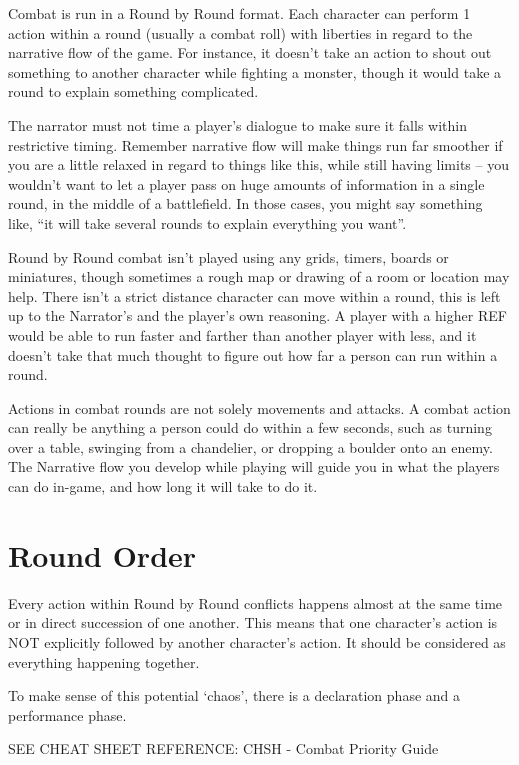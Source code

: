 Combat is run in a Round by Round format. Each character can perform 1 action within a round (usually a combat roll) with liberties in regard to the narrative flow of the game. For instance, it doesn’t take an action to shout out something to another character while fighting a monster, though it would take a round to explain something complicated.

The narrator must not time a player’s dialogue to make sure it falls within restrictive timing. Remember narrative flow will make things run far smoother if you are a little relaxed in regard to things like this, while still having limits – you wouldn’t want to let a player pass on huge amounts of information in a single round, in the middle of a battlefield. In those cases, you might say something like, “it will take several rounds to explain everything you want”.

Round by Round combat isn’t played using any grids, timers, boards or miniatures, though sometimes a rough map or drawing of a room or location may help. There isn’t a strict distance character can move within a round, this is left up to the Narrator’s and the player’s own reasoning. A player with a higher REF would be able to run faster and farther than another player with less, and it doesn’t take that much thought to figure out how far a person can run within a round.

Actions in combat rounds are not solely movements and attacks. A combat action can really be anything a person could do within a few seconds, such as turning over a table, swinging from a chandelier, or dropping a boulder onto an enemy. The Narrative flow you develop while playing will guide you in what the players can do in-game, and how long it will take to do it.

\section{Round Order} \label{sec:round_order}

Every action within Round by Round conflicts happens almost at the same time or in direct succession of one another. This means that one character’s action is NOT explicitly followed by another character’s action. It should be considered as everything happening together.

To make sense of this potential ‘chaos’, there is a declaration phase and a performance phase.

SEE CHEAT SHEET REFERENCE: CHSH - Combat Priority Guide

